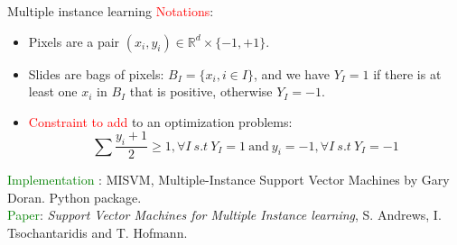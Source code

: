 \documentclass{beamer}
\begin{document}
\begin{frame}{Multiple instance learning}
\textcolor{red}{Notations}:
\begin{itemize}
\item Pixels are a pair $(x_i,y_i) \in \mathbb{R}^d \times \lbrace -1, +1\rbrace$.
\item Slides are bags of pixels: $B_I=\lbrace x_i, i\in I \rbrace$, and we have $Y_I=1$ if there is at least one $x_i$ in $B_I$ that is positive, otherwise $Y_I=-1$. 
\item \textcolor{red}{Constraint to add} to an optimization problems: \\
$$\sum \frac{y_i+1}{2} \geqslant 1, \forall I \ s.t \ Y_I=1 \ \text{and} \ y_i=-1, \forall I \ s.t \ Y_I=-1$$
\end{itemize}
\textcolor{green}{Implementation} : MISVM, Multiple-Instance Support Vector Machines by Gary Doran. Python package. \\
\textcolor{green}{Paper}: \textit{Support Vector Machines for Multiple Instance learning}, S. Andrews, I. Tsochantaridis and T. Hofmann.
\end{frame}
\end{document}
